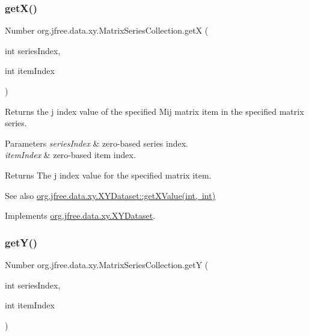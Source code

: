 \subsubsection{\texorpdfstring{get\+X()}{getX()}}
{\footnotesize\ttfamily Number org.\+jfree.\+data.\+xy.\+Matrix\+Series\+Collection.\+getX (\begin{DoxyParamCaption}\item[{int}]{series\+Index,  }\item[{int}]{item\+Index }\end{DoxyParamCaption})}

Returns the j index value of the specified Mij matrix item in the specified matrix series.


\begin{DoxyParams}{Parameters}
{\em series\+Index} & zero-\/based series index. \\
\hline
{\em item\+Index} & zero-\/based item index.\\
\hline
\end{DoxyParams}
\begin{DoxyReturn}{Returns}
The j index value for the specified matrix item.
\end{DoxyReturn}
\begin{DoxySeeAlso}{See also}
\mbox{\hyperlink{interfaceorg_1_1jfree_1_1data_1_1xy_1_1_x_y_dataset_a65bd212539d8f7dfb3d3d36b5f42e083}{org.\+jfree.\+data.\+xy.\+X\+Y\+Dataset\+::get\+X\+Value(int, int)}} 
\end{DoxySeeAlso}


Implements \mbox{\hyperlink{interfaceorg_1_1jfree_1_1data_1_1xy_1_1_x_y_dataset_a85c75ba5b69b551e96afd29d1732ba22}{org.\+jfree.\+data.\+xy.\+X\+Y\+Dataset}}.

\mbox{\label{classorg_1_1jfree_1_1data_1_1xy_1_1_matrix_series_collection_a7b873b64cb261ff072a480f22e29b505}} 
\subsubsection{\texorpdfstring{get\+Y()}{getY()}}
{\footnotesize\ttfamily Number org.\+jfree.\+data.\+xy.\+Matrix\+Series\+Collection.\+getY (\begin{DoxyParamCaption}\item[{int}]{series\+Index,  }\item[{int}]{item\+Index }\end{DoxyParamCaption})}

